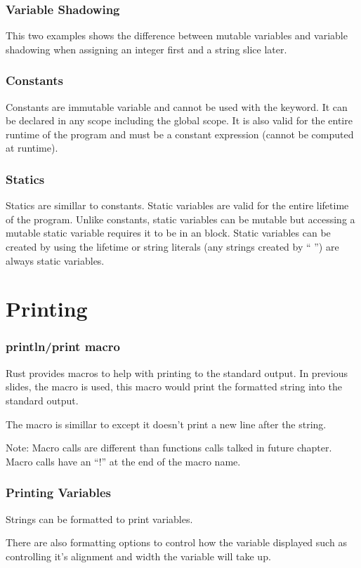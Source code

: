 \documentclass{beamer}
\begin{document}
\begin{frame}
  \frametitle{Variable Shadowing}
  This two examples shows the difference between mutable variables and variable shadowing when assigning an integer first and a string slice later.
  
  
\end{frame}

\begin{frame}
  \frametitle{Constants}
  Constants are immutable variable and cannot be used with the  keyword. It can be declared in any scope including the global scope. It is also valid for the entire runtime of the program and must be a constant expression (cannot be computed at runtime).
  
\end{frame}

\begin{frame}
  \frametitle{Statics}
  Statics are simillar to constants. Static variables are valid for the entire lifetime of the program. Unlike constants, static variables can be mutable but accessing a mutable static variable requires it to be in an  block. Static variables can be created by using the  lifetime or string literals (any strings created by `` '') are always static variables.
  
\end{frame}

\section{Printing}
\begin{frame}
  \frametitle{println/print macro}
  Rust provides macros to help with printing to the standard output. In previous slides, the  macro is used, this macro would print the formatted string into the standard output.
  
  The  macro is simillar to  except it doesn't print a new line after the string.

  \alert{Note:} Macro calls are different than functions calls talked in future chapter. Macro calls have an ``!'' at the end of the macro name.
\end{frame}

\begin{frame}
  \frametitle{Printing Variables}
  Strings can be formatted to print variables.
  
  There are also formatting options to control how the variable displayed such as controlling it's alignment and width the variable will take up.
  
\end{frame}
\end{document}
